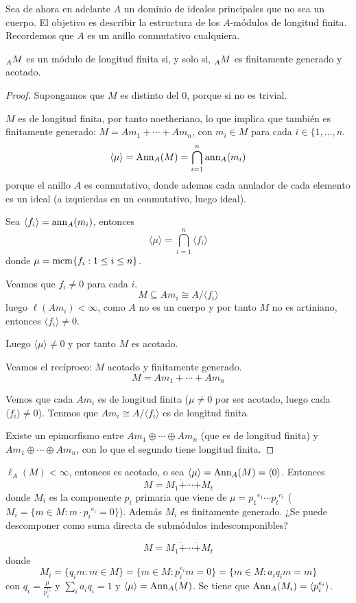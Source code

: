Sea de ahora en adelante \(A\) un dominio de ideales principales que no
sea un cuerpo. El objetivo es describir la estructura de los \(A\)-módulos
de longitud finita. Recordemos que \(A\) es un anillo conmutativo cualquiera.

\begin{prop}
  \(\prescript{}{A}{M}\) es un módulo de longitud finita si, y solo si,
  \(\prescript{}{A}{M}\) es finitamente generado y acotado.
\end{prop}
\begin{proof}
  Supongamos que \(M\) es distinto del 0, porque si no es trivial.

  \(M\) es de longitud finita, por tanto noetheriano, lo que implica que también
  es finitamente generado: \(M=Am_1+\cdots+Am_n\), con \(m_i\in M\) para cada
  \(i \in \{1, \ldots, n\).
  \[
    \langle\mu\rangle=\operatorname{Ann}_A(M)=\bigcap_{i=1}^n\operatorname{ann}_A(m_i)
  \]
  porque el anillo \(A\) es conmutativo, donde ademas cada anulador
  de cada elemento es un ideal (a izquierdas en un conmutativo, luego ideal).

  Sea \(\langle f_i\rangle=\operatorname{ann}_A(m_i)\), entonces
  \[
    \langle\mu\rangle=\bigcap_{i=1}^n\langle f_i\rangle
  \]
  donde \(\mu=\operatorname{mcm}\{f_i:1\le i\le n\}\).

  Veamos que \(f_i\neq 0\) para cada \(i\).
  \[
    M\subseteq Am_i\cong A/\langle f_i\rangle
  \]
  luego \(\ell(Am_i)<\infty\), como \(A\) no es un cuerpo y por
  tanto \(M\) no es artiniano, entonces
  \(\langle f_i\rangle\neq0\).

  Luego \(\langle\mu\rangle\neq 0\) y por tanto \(M\) es acotado.

  Veamos el recíproco: \(M\) acotado y finitamente generado.
  \[
    M=Am_1+\cdots+Am_n
  \]

  Vemos que cada \(Am_i\) es de longitud finita (\(\mu\neq 0\) por ser
  acotado, luego cada \(\langle f_i\rangle\neq 0\)).
  Tenmos que \(Am_i\cong A/\langle f_i\rangle\) es de longitud finita.

  Existe un epimorfismo entre \(Am_1\oplus\cdots\oplus Am_n\) (que es
  de longitud finita) y \(Am_1\oplus\cdots\oplus Am_n\), con lo que
  el segundo tiene longitud finita.
\end{proof}

\(\ell_A(M)<\infty\), entonces es acotado, o sea
\(\langle\mu\rangle=\operatorname{Ann}_A(M)=\langle 0\rangle\). Entonces
\[
  M=M_1\dot{+}\cdots\dot{+} M_t
\]
donde \(M_i\) es la componente \(p_i\) primaria que viene de
\(\mu={p_1}^{e_1}\cdots{p_t}^{e_t}\)
(\(M_i=\{m\in M:m\cdot{p_i}^{e_i}=0\}\)).
Además \(M_i\) es finitamente generado.
¿Se puede descomponer como suma directa de submódulos indescomponibles?


\[
  M=M_1\dot{+}\cdots\dot{+} M_t
\]
donde
\[
  M_i=\{q_i m: m\in M\}=\{m\in M: p_i^{e_i} m=0\}=\{m\in M:
  a_i q_i m = m\}
\]
con \(q_i=\frac{\mu}{p_i^{e_i}}\) y \(\sum_i a_i q_i=1\)
y \(\langle \mu\rangle=\operatorname{Ann}_A(M)\). Se tiene que
\(\operatorname{Ann}_A(M_i)=\langle p_i^{e_i}\rangle\).